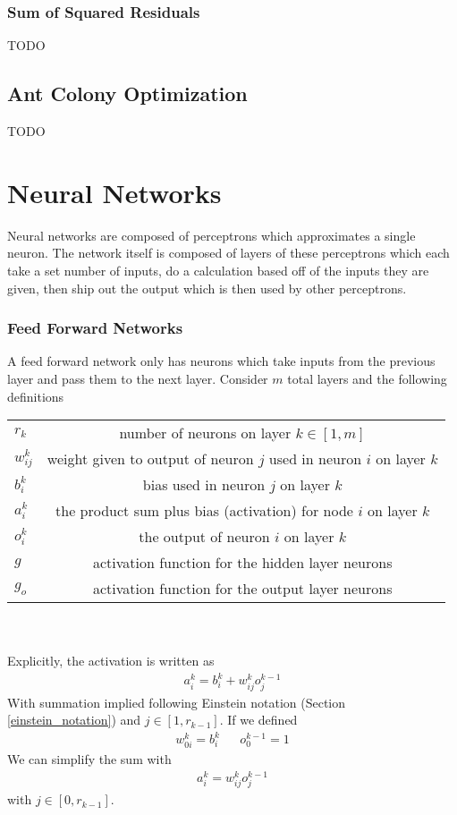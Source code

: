 \subsubsection{Sum of Squared Residuals}
TODO

\subsection{Ant Colony Optimization}
TODO

\section{Neural Networks}
Neural networks are composed of perceptrons which approximates a single neuron. The network itself is composed of layers of these perceptrons which each take a set number of inputs, do a calculation based off of the inputs they are given, then ship out the output which is then used by other perceptrons.

\subsubsection{Feed Forward Networks}
A feed forward network only has neurons which take inputs from the previous layer and pass them to the next layer. Consider $m$ total layers and the following definitions \cite{brilliant_backpropagation}
\\
\begin{tabular}{ l c }
  $r_k$ & number of neurons on layer $k\in[1,m]$\\
  $w_{ij}^k$ & weight given to output of neuron $j$ used in neuron $i$ on layer $k$  \\
  $b_i^k$ & bias used in neuron $j$ on layer $k$   \\
  $a_i^k$ & the product sum plus bias (activation) for node $i$ on layer $k$  \\
  $o_i^k$ & the output of neuron $i$ on layer $k$ \\
  $g$ & activation function for the hidden layer neurons \\
  $g_o$ & activation function for the output layer neurons \\
\end{tabular}\\
\\
Explicitly, the activation is written as
\begin{align}
	a_i^k =b_i^k + w_{ij}^ko_j^{k-1}
\end{align}
With summation implied following Einstein notation (Section \ref{einstein_notation}) and $j\in [1,r_{k-1}]$. If we defined 
\begin{align}
	w^k_{0i}=b_i^k && o_0^{k-1}=1
\end{align}
We can simplify the sum with
\begin{align}\label{nn_activation}
	a_i^k = w_{ij}^ko_j^{k-1}
\end{align}
with $j\in [0,r_{k-1}]$.

